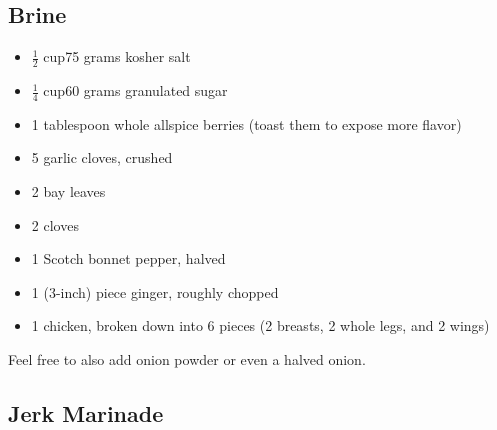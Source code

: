 \documentclass[]{article}
\providecommand{\tightlist}{%
  \setlength{\itemsep}{0pt}\setlength{\parskip}{0pt}}
\begin{document}
\hypertarget{brine}{%
\subsection{Brine}\label{brine}}

\begin{itemize}
\tightlist
\item
  \(\frac{1}{2}\) cup\textbar{}75 grams kosher salt
\item
  \(\frac{1}{4}\) cup\textbar{}60 grams granulated sugar
\item
  1 tablespoon whole allspice berries (toast them to expose more flavor)
\item
  5 garlic cloves, crushed
\item
  2 bay leaves
\item
  2 cloves
\item
  1 Scotch bonnet pepper, halved
\item
  1 (3-inch) piece ginger, roughly chopped
\item
  1 chicken, broken down into 6 pieces (2 breasts, 2 whole legs, and 2 wings)
\end{itemize}

Feel free to also add onion powder or even a halved onion.

\hypertarget{jerk-marinade}{%
\subsection{Jerk Marinade}\label{jerk-marinade}}
\end{document}
